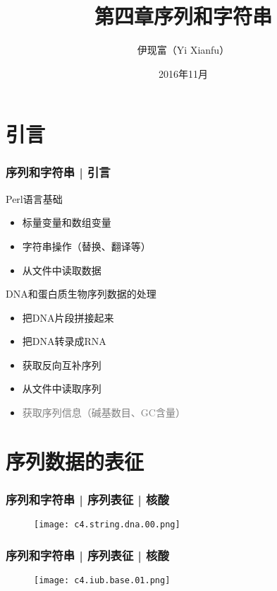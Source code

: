 


\title[序列和字符串]{第四章\quad 序列和字符串}
\author[Yixf]{伊现富（Yi Xianfu）}
\date{2016年11月}




\section{引言}
\begin{frame}
  \frametitle{序列和字符串 | 引言}
  \begin{block}{Perl语言基础}
    \begin{itemize}
      \item 标量变量和数组变量
      \item 字符串操作（替换、翻译等）
      \item 从文件中读取数据
    \end{itemize}
  \end{block}
  \pause
  \begin{block}{DNA和蛋白质生物序列数据的处理}
    \begin{itemize}
      \item 把DNA片段拼接起来
      \item 把DNA转录成RNA
      \item 获取反向互补序列
      \item 从文件中读取序列
      \item \textcolor{gray}{获取序列信息（碱基数目、GC含量）}
    \end{itemize}
  \end{block}
\end{frame}

\section{序列数据的表征}
\begin{frame}
  \frametitle{序列和字符串 | 序列表征 | 核酸}
  \begin{figure}
    \centering
    \texttt{[image: c4.string.dna.00.png]}
  \end{figure}
\end{frame}

\begin{frame}
  \frametitle{序列和字符串 | 序列表征 | 核酸}
  \begin{figure}
    \centering
    \texttt{[image: c4.iub.base.01.png]}
  \end{figure}
\end{frame}

